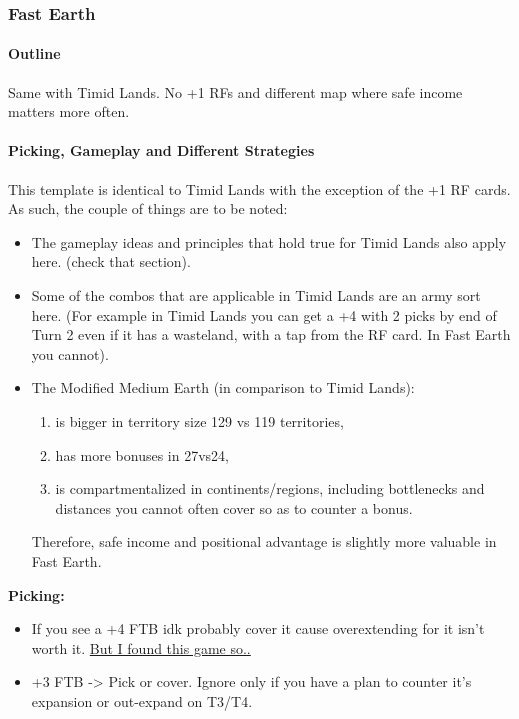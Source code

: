 \subsubsection{Fast Earth}

\paragraph{Outline}

Same with Timid Lands. No +1 RFs and different map where safe income matters more often.

\paragraph{Picking, Gameplay and Different Strategies}

This template is identical to Timid Lands with the exception of the +1 RF cards. As such, the couple of things are to be noted:
\begin{itemize}
    \item The gameplay ideas and principles that hold true for Timid Lands also apply here. (check that section).
    \item Some of the combos that are applicable in Timid Lands are an army sort here. (For example in Timid Lands you can get a +4 with 2 picks by end of Turn 2 even if it has a wasteland, with a tap from the RF card. In Fast Earth you cannot).
    \item The Modified Medium Earth (in comparison to Timid Lands):
    \begin{enumerate}
        \item is bigger in territory size 129 vs 119 territories,
        \item has more bonuses in 27vs24,
        \item is compartmentalized in continents/regions, including bottlenecks and distances you cannot often cover so as to counter a bonus. 
    \end{enumerate}
    Therefore, safe income and positional advantage is slightly more valuable in Fast Earth.
\end{itemize}

\textbf{Picking:}
\begin{itemize}
    \item If you see a +4 FTB idk probably cover it cause overextending for it isn't worth it. \href{https://www.warzone.com/MultiPlayer?GameID=41785096}{But I found this game so..}
    \item +3 FTB -> Pick or cover. Ignore only if you have a plan to counter it's expansion or out-expand on T3/T4.
\end{itemize}

